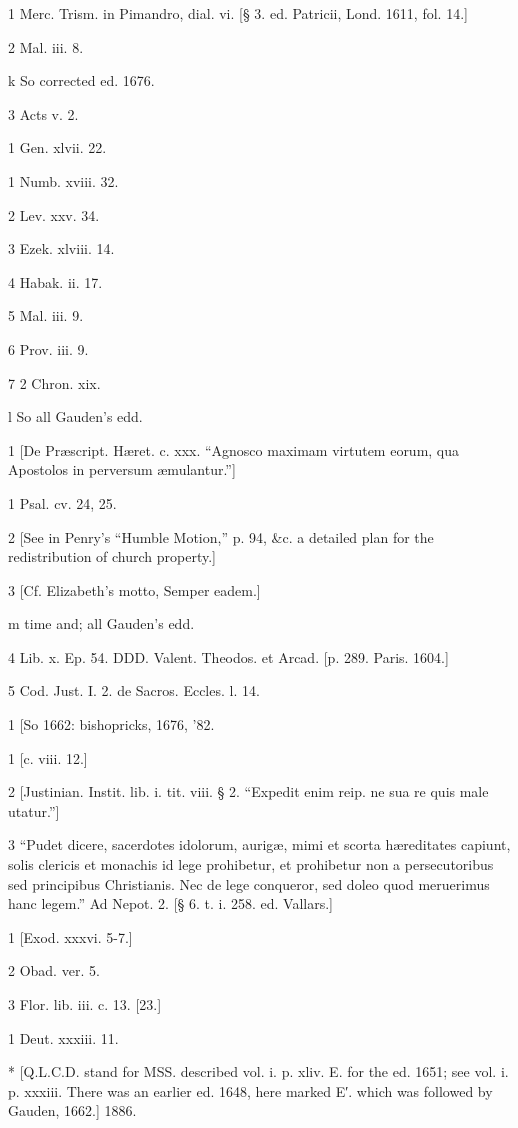 1
Merc. Trism. in Pimandro, dial. vi. [§ 3. ed. Patricii, Lond. 1611, fol. 14.]

2
Mal. iii. 8.

k
So corrected ed. 1676.

3
Acts v. 2.

1
Gen. xlvii. 22.

1
Numb. xviii. 32.

2
Lev. xxv. 34.

3
Ezek. xlviii. 14.

4
Habak. ii. 17.

5
Mal. iii. 9.

6
Prov. iii. 9.

7
2 Chron. xix.

l
So all Gauden’s edd.

1
[De Præscript. Hæret. c. xxx. “Agnosco maximam virtutem eorum, qua Apostolos in perversum æmulantur.”]

1
Psal. cv. 24, 25.

2
[See in Penry’s “Humble Motion,” p. 94, &c. a detailed plan for the redistribution of church property.]

3
[Cf. Elizabeth’s motto, Semper eadem.]

m
time and; all Gauden’s edd.

4
Lib. x. Ep. 54. DDD. Valent. Theodos. et Arcad. [p. 289. Paris. 1604.]

5
Cod. Just. I. 2. de Sacros. Eccles. l. 14.

1
[So 1662: bishopricks, 1676, ’82.

1
[c. viii. 12.]

2
[Justinian. Instit. lib. i. tit. viii. § 2. “Expedit enim reip. ne sua re quis male utatur.”]

3
“Pudet dicere, sacerdotes idolorum, aurigæ, mimi et scorta hæreditates capiunt, solis clericis et monachis id lege prohibetur, et prohibetur non a persecutoribus sed principibus Christianis. Nec de lege conqueror, sed doleo quod meruerimus hanc legem.” Ad Nepot. 2. [§ 6. t. i. 258. ed. Vallars.]

1
[Exod. xxxvi. 5-7.]

2
Obad. ver. 5.

3
Flor. lib. iii. c. 13. [23.]

1
Deut. xxxiii. 11.

*
[Q.L.C.D. stand for MSS. described vol. i. p. xliv. E. for the ed. 1651; see vol. i. p. xxxiii. There was an earlier ed. 1648, here marked E′. which was followed by Gauden, 1662.] 1886.

